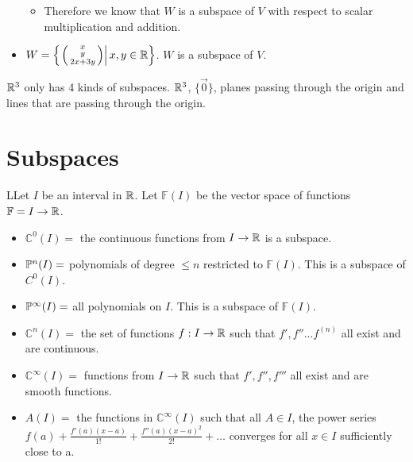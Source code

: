 \begin{itemize}
\begin{itemize}
      \item Therefore we know that $W$ is a subspace of $V$ with respect to scalar multiplication and addition.
    \end{itemize}
    \item $W=\left\{\left.\left(\begin{smallmatrix}x\\y\\2x+3y\end{smallmatrix}\right)\right|x,y\in\R\right\}$. $W$ is a subspace of $V$.
  \end{itemize}

  $\R^3$ only has 4 kinds of subspaces. $\R^3$, $\{\vec{0}\}$, planes passing through the origin and lines that are passing through the origin.

  
\section{Subspaces}

  \begin{definition}
    LLet $I$ be an interval in $\R$. Let $\mathbb{F}(I)$ be the vector space of functions $\mathbb{F}=I\to\R$.

    \begin{itemize}
      \item $\mathbb{C}^0(I)=$ the continuous functions from $I\to\R$ is a subspace.
      \item $\P^n(I)=$ polynomials of degree $\le n$ restricted to $\mathbb{F}(I)$. This is a subspace of $C^0(I)$.
      \item $\P^\infty(I)=$ all polynomials on $I$. This is a subspace of $\mathbb{F}(I)$.
      \item $\mathbb{C}^n (I)=$ the set of functions $f:I\to\R$ such that $f',f''...f^{(n)}$ all exist and are continuous.
      \item $\mathbb{C}^\infty(I)=$ functions from $I\to\R$ such that $f',f'',f'''$ all exist and are smooth functions.
      \item $A(I)=$ the functions in $\mathbb{C}^\infty(I)$ such that all $A\in I$, the power series $f(a)+\frac{f'(a)(x-a)}{1!}+\frac{f''(a)(x-a)^2}{2!}+\dots$ converges for all $x\in I$ sufficiently close to a.
    \end{itemize}
  \end{definition}

